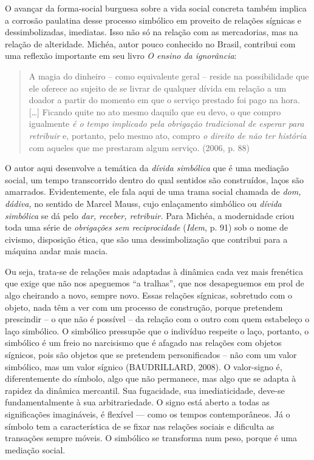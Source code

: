 O avançar da forma-social burguesa sobre a vida social concreta também
implica a corrosão paulatina desse processo simbólico em proveito de
relações sígnicas e dessimbolizadas, imediatas. Isso não só na relação
com as mercadorias, mas na relação de alteridade. Michéa, autor pouco
conhecido no Brasil, contribui com uma reflexão importante em seu livro
\emph{O ensino da ignorância}:

\begin{quote}
A magia do dinheiro -- como equivalente geral -- reside na possibilidade
que ele oferece ao sujeito de se livrar de qualquer dívida em relação a
um doador a partir do momento em que o serviço prestado foi pago na
hora. {[}\ldots{}{]} Ficando quite no ato mesmo daquilo que eu devo, o
que compro igualmente \emph{é o tempo implicado pela obrigação
tradicional de esperar para retribuir} e, portanto, pelo mesmo ato,
compro \emph{o direito de não ter história} com aqueles que me prestaram
algum serviço. (2006, p. 88)
\end{quote}

O autor aqui desenvolve a temática da \emph{dívida simbólica} que é uma
mediação social, um tempo transcorrido dentro do qual sentidos são
construídos, laços são amarrados. Evidentemente, ele fala aqui de uma
trama social chamada de \emph{dom, dádiva,} no sentido de Marcel Mauss,
cujo enlaçamento simbólico ou \emph{dívida simbólica} se dá pelo
\emph{dar, receber, retribuir.} Para Michéa, a modernidade criou toda
uma série de \emph{obrigações sem reciprocidade} (\emph{Idem}, p. 91)
sob o nome de civismo, disposição ética, que são uma dessimbolização que
contribui para a máquina andar mais macia.

Ou seja, trata-se de relações mais adaptadas à dinâmica cada vez mais
frenética que exige que não nos apeguemos ``a tralhas'', que nos
desapeguemos em prol de algo cheirando a novo, sempre novo. Essas
relações sígnicas, sobretudo com o objeto, nada têm a ver com um
processo de construção, porque pretendem prescindir -- o que não é
possível -- da relação com o outro com quem estabeleço o laço simbólico.
O simbólico pressupõe que o indivíduo respeite o laço, portanto, o
simbólico é um freio no narcisismo que é afagado nas relações com
objetos sígnicos, pois são objetos que se pretendem personificados --
não com um valor simbólico, mas um valor sígnico (BAUDRILLARD, 2008). O
valor-signo é, diferentemente do símbolo, algo que não permanece, mas
algo que se adapta à rapidez da dinâmica mercantil. Sua fugacidade, sua
imediaticidade, deve-se fundamentalmente à sua arbitrariedade. O signo
está aberto a todas as significações imagináveis, é flexível --- como os
tempos contemporâneos. Já o símbolo tem a característica de se fixar nas
relações sociais e dificulta as transações sempre móveis. O simbólico se
transforma num peso, porque é uma mediação social.

